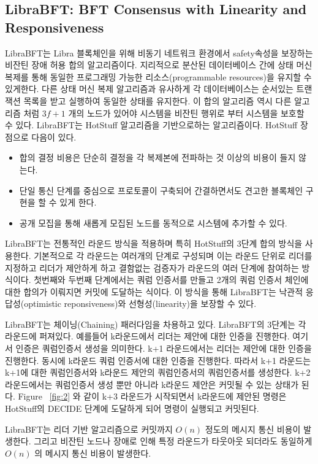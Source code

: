 \subsection{LibraBFT: BFT Consensus with Linearity and Responsiveness}
LibraBFT는 Libra 블록체인을 위해 비동기 네트워크 환경에서 safety속성을 보장하는 비잔틴 장애 허용 합의 알고리즘이다.
지리적으로 분산된 데이터베이스 간에 상태 머신 복제를 통해 동일한 프로그래밍 가능한 리소스(programmable resources)을
유지할 수 있게한다. 다른 상태 머신 복제 알고리즘과 유사하게 
각 데이터베이스는 순서있는 트랜잭션 목록을 받고 실행하여 동일한 상태를 유지한다.
 이 합의 알고리즘 역시 다른 알고리즘 처럼 \(3f+1\) 개의 노드가 있어야 시스템을 비잔틴 행위로 부터
시스템을 보호할 수 있다. LibraBFT는 HotStuff 알고리즘을 기반으로하는 알고리즘이다. HotStuff 장점으로 다음이 있다.
\begin{itemize}
  \item 합의 결정 비용은 단순히 결정을 각 복제본에 전파하는 것 이상의 비용이 들지 않는다.
  \item 단일 통신 단계를 중심으로 프로토콜이 구축되어 간결하면서도 견고한 블록체인 구현을 할 수 있게 한다.
  \item 공개 모집을 통해 새롭게 모집된 노드를 동적으로 시스템에 추가할 수 있다. 
\end{itemize}

LibraBFT는 전통적인 라운드 방식을 적용하며 특히 HotStuff의 3단계 합의 방식을 사용한다. 기본적으로 
각 라운드는 여러개의 단계로 구성되며 이는 라운드 단위로 리더를 지정하고 
리더가 제안하게 하고 결함없는 검증자가 라운드의 여러 단계에 참여하는 방식이다. 
첫번째와 두번째 단계에서는 쿼럼 인증서를 만들고 2개의 쿼럼 인증서 체인에 대한 합의가 이뤄지면 커밋에 도달하는 식이다.
이 방식을 통해 LibraBFT는 낙관적 응답성(optimistic reponsiveness)와 선형성(linearity)을 보장할 수 있다. 

LibraBFT는 체이닝(Chaining) 패러다임을 차용하고 있다. LibraBFT의 3단계는 각 라운드에 퍼져있다.
예를들어 k라운드에서 리더는 제안에 대한 인증을 진행한다.
여기서 인증은 쿼럼인증서 생성을 의미한다. k+1 라운드에서는 리더는 제안에 대한 인증을 진행한다.
동시에 k라운드 쿼럼 인증서에 대한 인증을 진행한다. 따라서 k+1 라운드는 k+1에 대한 쿼럼인증서와 
k라운드 제안의 쿼럼인증서의 쿼럼인증서를 생성한다. k+2 라운드에서는 쿼럼인증서 생성 뿐만 아니라 k라운드 제안은
커밋될 수 있는 상태가 된다. Figure ~\ref{fig:2} 와 같이 k+3 라운드가 시작되면서 k라운드에 제안된 명령은
HotStuff의 DECIDE 단계에 도달하게 되어 명령이 실행되고 커밋된다.

LibraBFT는 리더 기반 알고리즘으로 커밋까지 \(O(n)\) 정도의 메시지 통신 비용이 발생한다. 그리고 비잔틴 노드나
장애로 인해 특정 라운드가 타웃아웃 되더라도 동일하게 \(O(n)\) 의 메시지 통신 비용이 발생한다.



